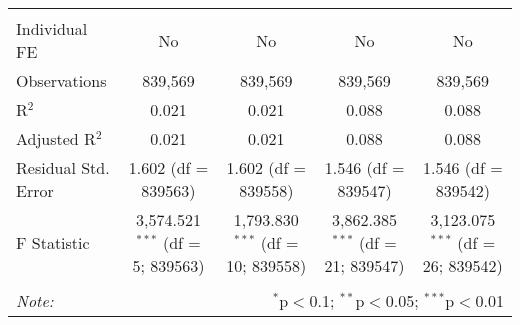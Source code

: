 \documentclass[
]{article}
\begin{document}
\begin{table}[!htbp]
{\begin{tabular}{@{\extracolsep{5pt}}lcccc}
\hline \\[-1.8ex] 
Individual FE & No & No & No & No \\ 
Observations & 839,569 & 839,569 & 839,569 & 839,569 \\ 
R$^{2}$ & 0.021 & 0.021 & 0.088 & 0.088 \\ 
Adjusted R$^{2}$ & 0.021 & 0.021 & 0.088 & 0.088 \\ 
Residual Std. Error & 1.602 (df = 839563) & 1.602 (df = 839558) & 1.546 (df = 839547) & 1.546 (df = 839542) \\ 
F Statistic & 3,574.521$^{***}$ (df = 5; 839563) & 1,793.830$^{***}$ (df = 10; 839558) & 3,862.385$^{***}$ (df = 21; 839547) & 3,123.075$^{***}$ (df = 26; 839542) \\ 
\hline 
\hline \\[-1.8ex] 
\textit{Note:}  & \multicolumn{4}{r}{$^{*}$p$<$0.1; $^{**}$p$<$0.05; $^{***}$p$<$0.01} \\ 
\end{tabular}
} 
\end{table} 
\newpage
\end{document}
